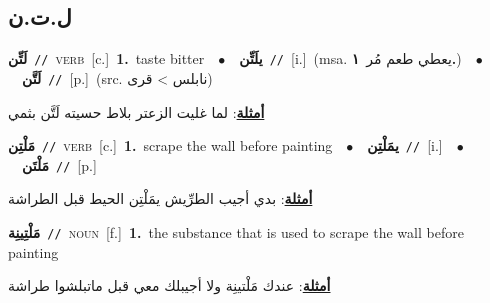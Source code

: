 \documentclass[10pt,a4paper,twoside]{article} %
\begin{document}
\begin{multicols}{2}
{{{{{{{{{{{{{{{\vspace{-3mm}
\subsection*{\color{blue}\foreignlanguage{arabic}{ل.ت.ن}\color{blue}{}} 

{\setlength\topsep{0pt}\textbf{\foreignlanguage{arabic}{لَتِّن}}\ {\color{gray}\texttt{//}\color{black}}\ \textsc{verb}\ [c.]\ \textbf{1.}~taste bitter\ \ $\bullet$\ \ \setlength\topsep{0pt}\textbf{\foreignlanguage{arabic}{يلَتِّن}}\ {\color{gray}\texttt{//}\color{black}}\ [i.]\ \color{gray}(msa. \foreignlanguage{arabic}{يعطي طعم مُر}~\foreignlanguage{arabic}{\textbf{١.}})\color{black}\ \ $\bullet$\ \ \setlength\topsep{0pt}\textbf{\foreignlanguage{arabic}{لَتَّن}}\ {\color{gray}\texttt{//}\color{black}}\ [p.]\ (src. \color{gray}\foreignlanguage{arabic}{نابلس > قرى}\color{black})\  \begin{flushright}\color{gray}\foreignlanguage{arabic}{\textbf{\underline{\foreignlanguage{arabic}{أمثلة}}}: لما غليت الزعتر بلاط حسيته لَتَّن بثمي}\end{flushright}\color{black}} \vspace{2mm}

{\setlength\topsep{0pt}\textbf{\foreignlanguage{arabic}{مَلْتِن}}\ {\color{gray}\texttt{//}\color{black}}\ \textsc{verb}\ [c.]\ \textbf{1.}~scrape the wall before painting\ \ $\bullet$\ \ \setlength\topsep{0pt}\textbf{\foreignlanguage{arabic}{يمَلْتِن}}\ {\color{gray}\texttt{//}\color{black}}\ [i.]\ \ $\bullet$\ \ \setlength\topsep{0pt}\textbf{\foreignlanguage{arabic}{مَلْتَن}}\ {\color{gray}\texttt{//}\color{black}}\ [p.]\  \begin{flushright}\color{gray}\foreignlanguage{arabic}{\textbf{\underline{\foreignlanguage{arabic}{أمثلة}}}: بدي أجيب الطرِّيش يمَلْتِن الحيط قبل الطراشة}\end{flushright}\color{black}} \vspace{2mm}

{\setlength\topsep{0pt}\textbf{\foreignlanguage{arabic}{مَلْتِينِة}}\ {\color{gray}\texttt{//}\color{black}}\ \textsc{noun}\ [f.]\ \textbf{1.}~the substance that is used to scrape the wall before painting\  \begin{flushright}\color{gray}\foreignlanguage{arabic}{\textbf{\underline{\foreignlanguage{arabic}{أمثلة}}}: عندك مَلْتينِة ولا أجيبلك معي قبل ماتبلشوا طراشة}\end{flushright}\color{black}} \vspace{2mm}

}}}}}}}}}}}}}}}
\end{multicols}
\end{document}

